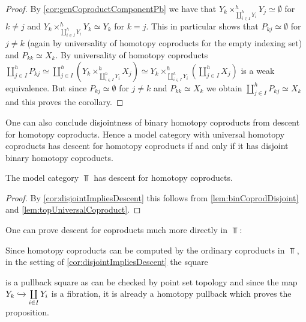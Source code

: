 \begin{corollary}
\begin{proof}
        By \cref{cor:genCoproductComponentPb} we have that $Y_k\times_{\coprod\limits_{i\in I}^hY_i}^h Y_j\simeq\emptyset$ for $k\neq j$ and $Y_k\times_{\coprod\limits_{i\in I}^hY_i}^h Y_k\simeq Y_k$ for $k=j$.
        This in particular shows that $P_{kj}\simeq\emptyset$ for $j\neq k$ (again by universality of homotopy coproducts for the empty indexing set) and $P_{kk}\simeq X_k$.
        By universality of homotopy coproducts $\coprod\limits_{j\in I}^hP_{kj}\simeq\coprod\limits_{j\in I}^h\left(Y_k\times_{\coprod\limits_{i\in I}^hY_i}^hX_j\right)\simeq Y_k\times_{\coprod\limits_{i\in I}^hY_i}^h\left(\coprod\limits_{j\in I}^hX_j\right)$ is a weak equivalence.
        But since $P_{kj}\simeq\emptyset$ for $j\neq k$ and $P_{kk}\simeq X_k$ we obtain $\coprod\limits_{j\in I}^hP_{kj}\simeq X_k$ and this proves the corollary.
    \end{proof}
\end{corollary}
\begin{remark}
    One can also conclude disjointness of binary homotopy coproducts from descent for homotopy coproducts.
    Hence a model category with universal homotopy coproducts has descent for homotopy coproducts if and only if it has disjoint binary homotopy coproducts.
\end{remark}
\begin{corollary}\label{cor:topDescentCoproduct}
    The model category $\Top$ has descent for homotopy coproducts.
    \begin{proof}
        By \cref{cor:disjointImpliesDescent} this follows from \cref{lem:binCoprodDisjoint} and \cref{lem:topUniversalCoproduct}.
    \end{proof}
\end{corollary}
\begin{remark}
    One can prove descent for coproducts much more directly in $\Top$:
    
    Since homotopy coproducts can be computed by the ordinary coproducts in $\Top$, in the setting of \cref{cor:disjointImpliesDescent} the square
    \begin{center}
    \end{center}
    is a pullback square as can be checked by point set topology and since the map $Y_k\xhookrightarrow{}\coprod\limits_{i\in I}Y_i$ is a fibration, it is already a homotopy pullback which proves the proposition.
\end{remark}

